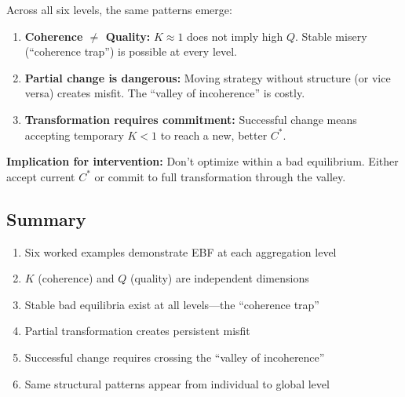 \begin{tcolorbox}[colback=blue!5!white, colframe=blue!75!black,
    title=\textbf{Integration: The Three Laws of Coherence}]

Across all six levels, the same patterns emerge:

\begin{enumerate}
    \item \textbf{Coherence $\neq$ Quality:} $K \approx 1$ does not imply high $Q$.
          Stable misery (``coherence trap'') is possible at every level.

    \item \textbf{Partial change is dangerous:} Moving strategy without structure
          (or vice versa) creates misfit. The ``valley of incoherence'' is costly.

    \item \textbf{Transformation requires commitment:} Successful change means
          accepting temporary $K < 1$ to reach a new, better $C^*$.
\end{enumerate}

\textbf{Implication for intervention:} Don't optimize within a bad equilibrium.
Either accept current $C^*$ or commit to full transformation through the valley.

\end{tcolorbox}


\subsection{Summary}

\begin{tcolorbox}[colback=gray!5!white, colframe=gray!75!black,
    title=\textbf{Summary: Appendix F Key Points}]

\begin{enumerate}
    \item Six worked examples demonstrate EBF at each aggregation level
    \item $K$ (coherence) and $Q$ (quality) are independent dimensions
    \item Stable bad equilibria exist at all levels—the ``coherence trap''
    \item Partial transformation creates persistent misfit
    \item Successful change requires crossing the ``valley of incoherence''
    \item Same structural patterns appear from individual to global level
\end{enumerate}

\end{tcolorbox}

